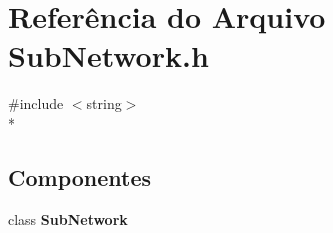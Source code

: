 \section{Referência do Arquivo Sub\+Network.\+h}
\label{_sub_network_8h}
{\ttfamily \#include $<$string$>$}\\*
\subsection*{Componentes}
\begin{DoxyCompactItemize}
\item 
class {\bf Sub\+Network}
\end{DoxyCompactItemize}
